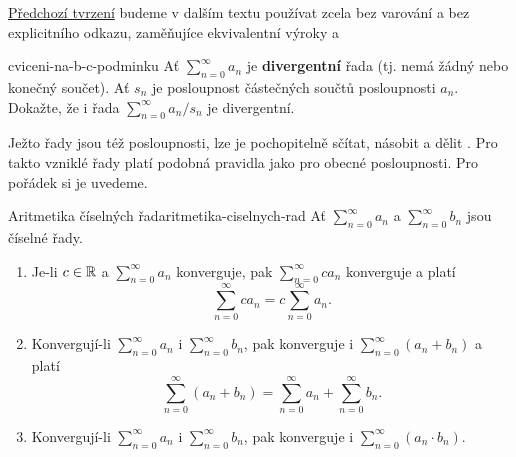 \hyperref[prop:vztah-konvergence-a-existence-souctu]{Předchozí tvrzení} budeme v
dalším textu používat zcela bez varování a bez explicitního odkazu, zaměňujíce
ekvivalentní výroky  a 

\begin{exercise}{}{cviceni-na-b-c-podminku}
 Ať $\sum_{n = 0}^{\infty} a_n$ je \textbf{divergentní} řada (tj. nemá žádný
 nebo konečný součet). Ať $s_n$ je posloupnost částečných součtů posloupnosti
 $a_n$. Dokažte, že i řada $\sum_{n = 0}^{\infty} a_n / s_n$ je divergentní.
\end{exercise}

Ježto řady jsou též posloupnosti, lze je pochopitelně sčítat, násobit a dělit
. Pro takto vzniklé řady platí podobná pravidla jako pro
obecné posloupnosti. Pro pořádek si je uvedeme.

\begin{proposition}{Aritmetika číselných řad}{aritmetika-ciselnych-rad}
 Ať $\sum_{n=0}^{\infty} a_n$ a $\sum_{n=0}^{\infty} b_n$ jsou číselné řady.
 \begin{enumerate}
  \item Je-li $c \in \mathbb{R}$ a $\sum_{n=0}^{\infty} a_n$ konverguje, pak
   $\sum_{n=0}^{\infty} c a_n$ konverguje a platí
   \[
    \sum_{n=0}^{\infty} ca_n = c \sum_{n=0}^{\infty} a_n.
   \]
  \item Konvergují-li $\sum_{n=0}^{\infty} a_n$ i $\sum_{n=0}^{\infty} b_n$, pak
   konverguje i $\sum_{n=0}^{\infty} (a_n + b_n)$ a platí
   \[
    \sum_{n=0}^{\infty} (a_n + b_n) = \sum_{n=0}^{\infty} a_n +
    \sum_{n=0}^{\infty} b_n.
   \]
  \item Konvergují-li $\sum_{n=0}^{\infty} a_n$ i $\sum_{n=0}^{\infty} b_n$, pak
   konverguje i $\sum_{n=0}^{\infty} (a_n \cdot b_n)$.
 \end{enumerate}
\end{proposition}

